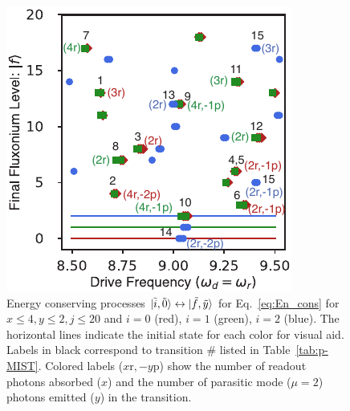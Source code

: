 \documentclass[%
reprint,
superscriptaddress,
 amsmath,amssymb,
 aps,
 prx,
longbibliography,
floatfix,
]{revtex4-2}
\begin{document}
\begin{figure}[!htb]
    \centering
    \includegraphics[width=\linewidth]{Figures/Trans_.pdf}
    \caption{Energy conserving processes $\ket{\tilde{i},\tilde{0}}\leftrightarrow\ket{\tilde{f},\tilde{y}}$ for Eq.~\ref{eq:En_cons} for $x\le 4, y\le 2, j\le 20$ and $i=0$ (red), $i=1$ (green), $i=2$ (blue). The horizontal lines indicate the initial state for each color for visual aid. Labels in black correspond to transition $\#$ listed in Table~\ref{tab:p-MIST}. Colored labels ($x \mathrm{r},-y \mathrm{p}$) show the number of readout photons absorbed ($x$) and the number of parasitic mode ($\mu=2$) photons emitted ($y$) in the transition.}
    \label{fig:trans_prof}
\end{figure}
\end{document}
